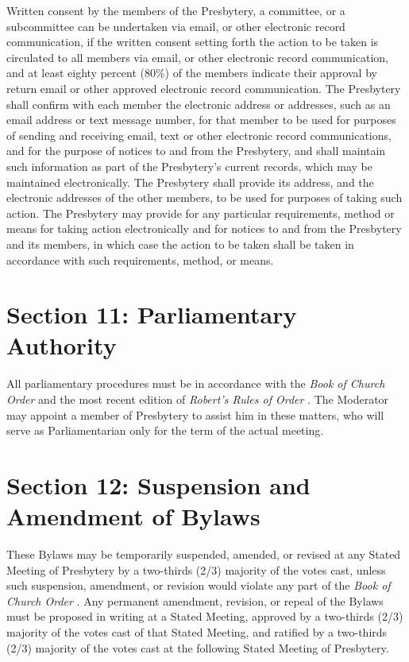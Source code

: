 \documentclass[
]{book}
\begin{document}
Written consent by the members of the Presbytery, a committee, or a subcommittee can be undertaken via email, or other electronic record communication, if the written consent setting forth the action to be taken is circulated to all members via email, or other electronic record communication, and at least eighty percent (80\%) of the members indicate their approval by return email or other approved electronic record communication. The Presbytery shall confirm with each member the electronic address or addresses, such as an email address or text message number, for that member to be used for purposes of sending and receiving email, text or other electronic record communications, and for the purpose of notices to and from the Presbytery, and shall maintain such information as part of the Presbytery's current records, which may be maintained electronically. The Presbytery shall provide its address, and the electronic addresses of the other members, to be used for purposes of taking such action. The Presbytery may provide for any particular requirements, method or means for taking action electronically and for notices to and from the Presbytery and its members, in which case the action to be taken shall be taken in accordance with such requirements, method, or means.

\hypertarget{section-11-parliamentary-authority}{%
\section{Section 11: Parliamentary Authority}\label{section-11-parliamentary-authority}}

All parliamentary procedures must be in accordance with the \emph{Book of Church Order} and the most recent edition of \emph{Robert's Rules of Order} . The Moderator may appoint a member of Presbytery to assist him in these matters, who will serve as Parliamentarian only for the term of the actual meeting.

\hypertarget{section-12-suspension-and-amendment-of-bylaws}{%
\section{Section 12: Suspension and Amendment of Bylaws}\label{section-12-suspension-and-amendment-of-bylaws}}

These Bylaws may be temporarily suspended, amended, or revised at any Stated Meeting of Presbytery by a two-thirds (2/3) majority of the votes cast, unless such suspension, amendment, or revision would violate any part of the \emph{Book of Church Order} . Any permanent amendment, revision, or repeal of the Bylaws must be proposed in writing at a Stated Meeting, approved by a two-thirds (2/3) majority of the votes cast of that Stated Meeting, and ratified by a two-thirds (2/3) majority of the votes cast at the following Stated Meeting of Presbytery.
\end{document}
